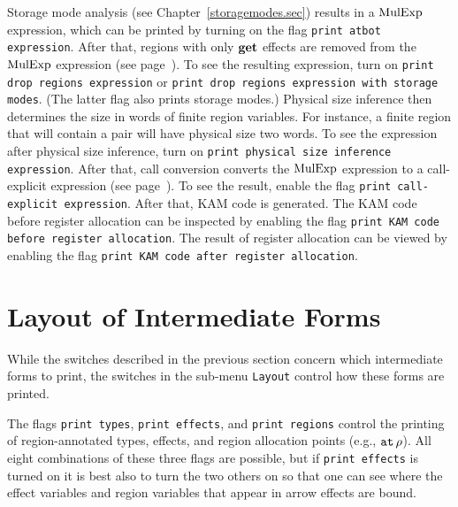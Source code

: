 \documentclass[12pt]{book}
\begin{document}
Storage mode analysis (see Chapter~\ref{storagemodes.sec}) results in
a $\hbox{\rm MulExp}$ expression, which can be printed
by turning on the flag
%
\texttt{print atbot expression}.  After that, regions
with only $\mathop{\bf get}\nolimits$ effects are removed from the $\hbox{\rm MulExp}$
expression (see page~\pageref{bother-to-distinguish-get-n-put}).  To
see the resulting expression, turn on 
%
\texttt{print drop regions expression} or \texttt{print drop regions
  expression with storage modes}. (The latter flag also prints storage
modes.)
%
%
Physical size inference then determines the size in words of finite
region variables.  For instance, a finite region that will contain a
pair will have physical size two words.  To see the expression after
physical size inference, turn on 
%
\texttt{print physical size inference expression}.  After that,
%
call conversion converts the $\hbox{\rm MulExp}$ expression to a
call-explicit expression (see
page~\pageref{call-explicit}).  To see the result, enable the flag
\texttt{print call-explicit expression}.  After that,
%
KAM code is generated.  The KAM code before register allocation can be
inspected by enabling the flag 
%
\texttt{print KAM code before register allocation}. The result of
%
register allocation can be viewed by enabling the flag 
%
\texttt{print KAM code after register allocation}.

\section{Layout of Intermediate Forms}
\label{layout_intermediate_forms.sec}
While the switches described in the previous section concern which
intermediate forms to print, the switches in the sub-menu
\texttt{Layout} control how these forms are
printed.

The flags 
%
\texttt{print types},
%
\texttt{print effects}, and
%
\texttt{print regions} control the printing of region-annotated types,
effects, and region allocation points (e.g., $\mathbin{\hbox{\tt at}}\,\rho$).
All eight combinations of these three flags are possible, but if
%
{\tt print effects} is turned on it is best also to turn the two
others on so that one can see where the effect variables and region variables
that appear in arrow effects are bound.
\end{document}
